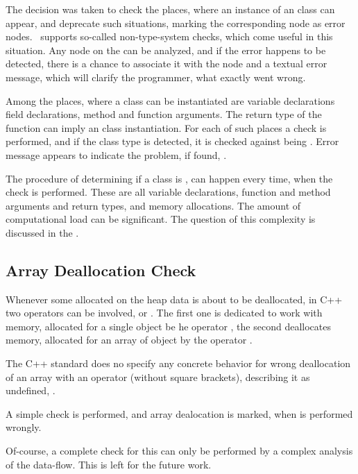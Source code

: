 The decision was taken to check the places, where an instance of an  class can appear, and deprecate such situations, marking the 
corresponding node as error nodes.
\jbmps\ supports so-called non-type-system checks, which come useful in this situation. Any node on the  can be analyzed, and 
if the error happens to be detected, there is a chance to associate it with the node and a textual error message, which will
clarify the programmer, what exactly went wrong. 

Among the places, where a class can be instantiated are variable declarations field declarations, method and function arguments.
The return type of the function can imply an  class instantiation. For each of such places a check is performed, 
and if the class type is detected, it is checked against being . Error message appears to indicate the problem, 
if found, . 

The procedure of determining if a class is , can happen every time, when the check is performed. These are all 
variable declarations, function and method arguments and return types, and memory allocations. The amount of computational
load can be significant. The question of this complexity is discussed in the .


\subsection{Array Deallocation Check}
Whenever some allocated on the heap data is about to be deallocated, in C++ two operators can
be involved,  or . The first one is dedicated to work with memory, allocated
for a single object be he operator , the second deallocates memory, allocated for an array
of object by the operator .

The C++ standard does no specify any concrete behavior for wrong deallocation of an array with 
an operator  (without square brackets), describing it as undefined, \cite{cpp11}.
 
A simple check is performed, and array dealocation is marked, when is performed wrongly. 

Of-course, a complete check for this can only be performed by a complex analysis of the data-flow.
This is left for the future work.


